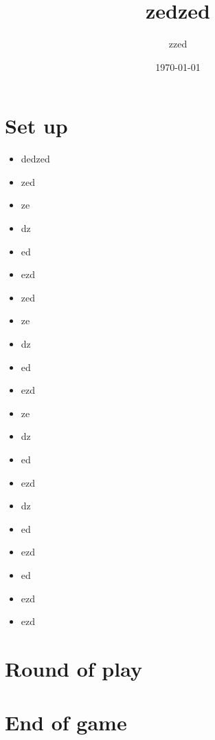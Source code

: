 \documentclass{article}%
\title{zedzed}%
\author{zzed}%
\date{\today}%
\begin{document}
%
\pagestyle{empty}%
\normalsize%
\maketitle%
\section{ Set up
}%
\label{sec:Setup}%
\begin{itemize}%
\item%
 dedzed
%
\item%
 zed
%
\item%
 ze
%
\item%
 dz
%
\item%
 ed
%
\item%
 ezd
%
\end{itemize}%
\begin{itemize}%
\item%
 zed
%
\item%
 ze
%
\item%
 dz
%
\item%
 ed
%
\item%
 ezd
%
\end{itemize}%
\begin{itemize}%
\item%
 ze
%
\item%
 dz
%
\item%
 ed
%
\item%
 ezd
%
\end{itemize}%
\begin{itemize}%
\item%
 dz
%
\item%
 ed
%
\item%
 ezd
%
\end{itemize}%
\begin{itemize}%
\item%
 ed
%
\item%
 ezd
%
\end{itemize}%
\begin{itemize}%
\item%
 ezd
%
\end{itemize}

%
\section{ Round of play
}%
\label{sec:Roundofplay}%

%
\section{ End of game}%
\label{sec:Endofgame}%

%
\end{document}
